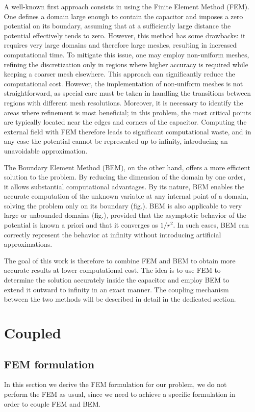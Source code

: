 \documentclass[11pt,onecolumn]{article}
\begin{document}
A well-known first approach consists in using the Finite Element Method (FEM). One defines a domain large enough to contain the capacitor and imposes a zero potential on its boundary, assuming that at a sufficiently large distance the potential effectively tends to zero. However, this method has some drawbacks: it requires very large domains and therefore large meshes, resulting in increased computational time. {\color{cyan}To mitigate this issue, one may employ non-uniform meshes, refining the discretization only in regions where higher accuracy is required while keeping a coarser mesh elsewhere. This approach can significantly reduce the computational cost. However, the implementation of non-uniform meshes is not straightforward, as special care must be taken in handling the transitions between regions with different mesh resolutions. Moreover, it is necessary to identify the areas where refinement is most beneficial; in this problem, the most critical points are typically located near the edges and corners of the capacitor.} Computing the external field with FEM therefore leads to significant computational waste, and in any case the potential cannot be represented up to infinity, introducing an unavoidable approximation.

The Boundary Element Method (BEM), on the other hand, offers a more efficient solution to the problem. By reducing the dimension of the domain by one order, it allows substantial computational advantages. By its nature, BEM enables the accurate computation of the unknown variable at any internal point of a domain, solving the problem only on its boundary (fig.). BEM is also applicable to very large or unbounded domains (fig.), provided that the asymptotic behavior of the potential is known a priori and that it converges as $1/r^2$. In such cases, BEM can correctly represent the behavior at infinity without introducing artificial approximations.

The goal of this work is therefore to combine FEM and BEM to obtain more accurate results at lower computational cost. The idea is to use FEM to determine the solution accurately inside the capacitor and employ BEM to extend it outward to infinity in an exact manner. The coupling mechanism between the two methods will be described in detail in the dedicated section.

\section{Coupled}
\subsection{FEM formulation}
In this section we derive the FEM formulation for our problem, we do not perform the FEM as usual, since we need to achieve a specific formulation in order to couple FEM and BEM.
\end{document}
